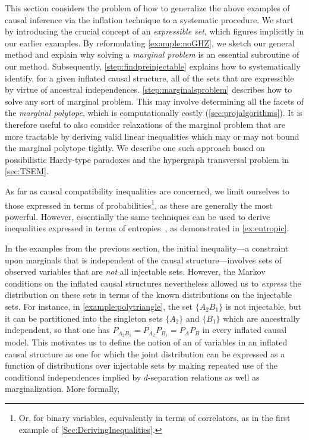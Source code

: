 \documentclass[aps,english,10pt,superscriptaddress,onecolumn,twoside,longbibliography,pra,floatfix,fleqn,nofootinbib]{revtex4-1}
\newcommand*{\tblue}[1]{{\color{MidnightBlue}{\textbf{#1}}}}
\theoremstyle{definition}
\newcounter{example}[section]
\begin{document}
This section considers the problem of how to generalize the above examples of causal inference via the inflation technique to a systematic procedure. We start by introducing the crucial concept of an \emph{expressible set},
 which figures implicitly in our earlier examples. By reformulating \cref{example:noGHZ}, we sketch our general method and explain why solving a \emph{marginal problem} is an essential subroutine of our method. Subsequently, \cref{step:findpreinjectable} explains how to systematically identify, for a given inflated causal structure, all of the 
 sets that are expressible by virtue of ancestral independences.
 \cref{step:marginalsproblem} describes how to solve any sort of marginal problem. This may involve determining all the facets of the \emph{marginal polytope}, which is computationally costly (\cref{sec:projalgorithms}).  It is therefore useful to also consider relaxations of the marginal problem that are more tractable by deriving valid linear inequalities which may or may not bound the marginal polytope tightly. We describe one such approach based on possibilistic Hardy-type paradoxes and the hypergraph transversal problem in \cref{sec:TSEM}.

As far as causal compatibility inequalities are concerned, we limit ourselves to those expressed in terms of probabilities\footnote{Or, for binary variables, equivalently in terms of correlators, as in the first example of \cref{Sec:DerivingInequalities}.}, as these are generally the most powerful. However, essentially the same techniques can be used to derive inequalities expressed in terms of entropies~\cite{fritz2013marginal}, as demonstrated in \cref{ex:entropic}. 

In the examples from the previous section, the initial inequality---a constraint upon marginals that is independent of the causal structure---involves sets of observed variables that are \emph{not} all injectable sets. However, the Markov conditions on the inflated causal structures nevertheless allowed us to \emph{express} the distribution on these sets in terms of the known distributions on the injectable sets. For instance, in \cref{example:polytriangle}, the set $\{ A_2 B_1\}$ is not injectable, but it can be partitioned into the singleton sets $\{ A_2 \}$ and $\{ B_1\}$ which are ancestrally independent, so that one has $P_{A_2 B_1} = P_{A_2} P_{B_1} = P_A P_B$ in every inflated causal model.  This motivates us to define the notion of an \tblue{expressible set} of variables in an inflated causal structure as one for which the joint distribution can be expressed as a function of distributions over injectable sets by making repeated use of the conditional independences implied by $d$-separation relations as well as marginalization. More formally,
\end{document}
